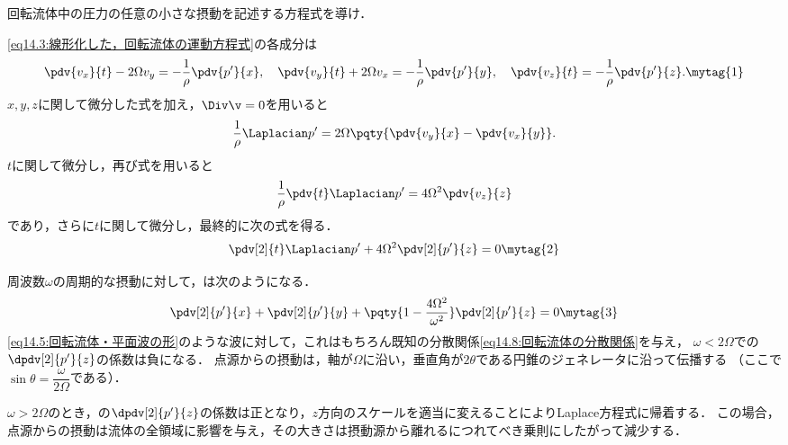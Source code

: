 \begin{mondai}{}{}
回転流体中の圧力の任意の小さな摂動を記述する方程式を導け．
\end{mondai}
\begin{kaitou}
\eqref{eq14.3:線形化した，回転流体の運動方程式}の各成分は
\[
    \pdv{v_x}{t} -2\Omega v_y = -\frac{1}{\rho} \pdv{p'}{x}, \quad
    \pdv{v_y}{t} +2\Omega v_x = -\frac{1}{\rho} \pdv{p'}{y}, \quad
    \pdv{v_z}{t} = - \frac{1}{\rho} \pdv{p'}{z} .
    \mytag{1}
\] 
$x,y,z$に関して微分した式を加え，$\Div\v=0$を用いると
\[
    \frac{1}{\rho} \Laplacian p' = 2\Omega \pqty{ \pdv{v_y}{x}-\pdv{v_x}{y} } .
\]
$t$に関して微分し，再び式を用いると 
\[
    \frac{1}{\rho} \pdv{t} \Laplacian p' = 4\Omega^2 \pdv{v_z}{z}
\]
であり，さらに$t$に関して微分し，最終的に次の式を得る． 
\[
    \pdv[2]{t}\Laplacian p' + 4\Omega^2 \pdv[2]{p'}{z} = 0
    \mytag{2}
\]

周波数$\omega$の周期的な摂動に対して，は次のようになる． 
\[
    \pdv[2]{p'}{x} + \pdv[2]{p'}{y} + \pqty{1-\frac{4\Omega^2}{\omega^2}} \pdv[2]{p'}{z} = 0
    \mytag{3}
\]
\eqref{eq14.5:回転流体・平面波の形}のような波に対して，これはもちろん既知の分散関係\eqref{eq14.8:回転流体の分散関係}を与え，
$\omega<2\Omega$での$\dpdv[2]{p'}{z}$の係数は負になる．
点源からの摂動は，軸が$\Omega$に沿い，垂直角が$2\theta$である円錐のジェネレータに沿って伝播する
（ここで$\sin\theta=\dfrac{\omega}{2\Omega}$である）． 

$\omega>2\Omega$のとき，の$\dpdv[2]{p'}{z}$の係数は正となり，$z$方向のスケールを適当に変えることによりLaplace方程式に帰着する．
この場合，点源からの摂動は流体の全領域に影響を与え，その大きさは摂動源から離れるにつれてべき乗則にしたがって減少する．



\end{kaitou}







\BackToTheToc